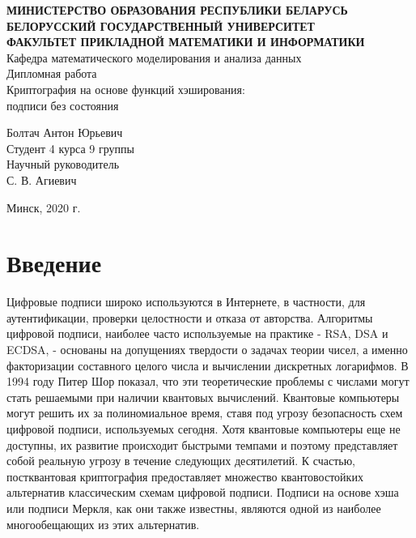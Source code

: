\documentclass[a4paper, 14pt]{extarticle}
\begin{document}

\begin{center}
    \normalsize{\textbf{МИНИСТЕРСТВО ОБРАЗОВАНИЯ РЕСПУБЛИКИ БЕЛАРУСЬ}}\\
    \hfill \break
    \normalsize{\textbf{БЕЛОРУССКИЙ ГОСУДАРСТВЕННЫЙ УНИВЕРСИТЕТ}}\\
    \hfill \break
    \small{\textbf{ФАКУЛЬТЕТ ПРИКЛАДНОЙ МАТЕМАТИКИ И ИНФОРМАТИКИ}}\\
    \hfill \break
    \large{Кафедра математического моделирования и анализа данных}\\
    \vspace{40mm}
    \normalsize{Дипломная работа}\\
    \hfill \break
    \normalsize{Криптография на основе функций хэширования:\\ подписи без состояния}\\
    \hfill \break
\end{center}

\begin{flushright}
    \vspace{20mm}
    Болтач Антон Юрьевич\\
    Студент 4 курса 9 группы\\
    Научный руководитель\\
    С. В. Агиевич\\
\end{flushright}

\vfill
\begin{center}
    Минск, 2020 г.
\end{center}
\thispagestyle{empty} %
    

\newpage

\tableofcontents
\newpage

\section{Введение}
Цифровые подписи широко используются в Интернете, в частности, для аутентификации, проверки целостности и отказа от авторства. Алгоритмы цифровой подписи, наиболее часто используемые на практике - RSA, DSA и ECDSA, - основаны на допущениях твердости о задачах теории чисел, а именно факторизации составного целого числа и вычислении дискретных логарифмов. В 1994 году Питер Шор показал, что эти теоретические проблемы с числами могут стать решаемыми при наличии квантовых вычислений. Квантовые компьютеры могут решить их за полиномиальное время, ставя под угрозу безопасность схем цифровой подписи, используемых сегодня. Хотя квантовые компьютеры еще не доступны, их развитие происходит быстрыми темпами и поэтому представляет собой реальную угрозу в течение следующих десятилетий. К счастью, постквантовая криптография предоставляет множество квантовостойких альтернатив классическим схемам цифровой подписи. Подписи на основе хэша или подписи Меркля, как они также известны, являются одной из наиболее многообещающих из этих альтернатив.
\end{document}
